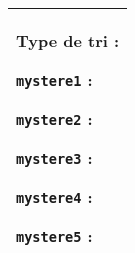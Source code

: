 \documentclass[10pt,fleqn]{article} %
\begin{document}

\vspace{2cm}
\pagestyle{fancy}
\thispagestyle{plain}


\subparagraph{} 
\begin{center}
\begin{tabular}{|p{.95\linewidth}|}
\hline
\vspace{.7cm}
\dotfill

\vspace{.7cm}
\dotfill

\vspace{.7cm}
\dotfill

\vspace{.7cm}
\dotfill

\vspace{.7cm}
\dotfill

\vspace{.7cm}
\dotfill

\vspace{.7cm}
\dotfill

\vspace{.7cm}
\dotfill

\vspace{.7cm}
\dotfill

\vspace{.5cm} \\
\hline
\end{tabular}
\end{center}

\subparagraph{} 
\begin{center}
\begin{tabular}{|p{.95\linewidth}|}
\hline

\vspace{.5cm}
Type de tri : \dotfill 
\vspace{.7cm}
\dotfill

\texttt{mystere1} : \dotfill 
\vspace{.7cm}


\texttt{mystere2} : \dotfill 
\vspace{.7cm}

\texttt{mystere3} : \dotfill 
\vspace{.7cm}

\texttt{mystere4} : \dotfill 
\vspace{.7cm}

\texttt{mystere5} : \dotfill 
\vspace{.7cm} \\
\hline
\end{tabular}
\end{center}
\end{document}
